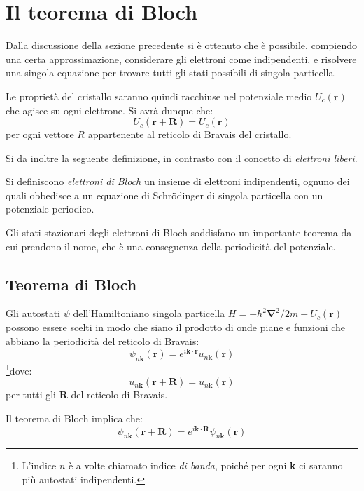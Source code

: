 \section{Il teorema di Bloch}

Dalla discussione della sezione precedente si è ottenuto che è possibile, compiendo una certa approssimazione, considerare gli elettroni come indipendenti, e risolvere una singola equazione per trovare tutti gli stati possibili di singola particella. 

Le proprietà del cristallo saranno quindi racchiuse nel potenziale medio $ U_c(\textbf{r}) $ che agisce su ogni elettrone. Si avrà dunque che:
\[ U_c(\textbf{r} + \textbf{R}) = U_c(\textbf{r}) \]
per ogni vettore $ R $ appartenente al reticolo di Bravais del cristallo.

Si da inoltre la seguente definizione, in contrasto con il concetto di \textit{elettroni liberi}.
\begin{defn}
	Si definiscono \textit{elettroni di Bloch} un insieme di elettroni indipendenti, ognuno dei quali obbedisce a un equazione di Schrödinger di singola particella con un potenziale periodico.
\end{defn}
Gli stati stazionari degli elettroni di Bloch soddisfano un importante teorema da cui prendono il nome, che è una conseguenza della periodicità del potenziale.

\subsection{Teorema di Bloch}

\begin{thm}[di Bloch]
	Gli autostati $ \psi $ dell'Hamiltoniano singola particella $ H = - \hbar^2\bm{\nabla}^2/2m + U_c(\textbf{r}) $ possono essere scelti in modo che siano il prodotto di onde piane e funzioni che abbiano la periodicità del reticolo di Bravais:
	\[ \psi_{n\textbf{k}}(\textbf{r}) = e^{i\textbf{k}\cdot\textbf{r}} u_{n\textbf{k}}(\textbf{r}) \]
	\footnote{L'indice $ n $ è a volte chiamato indice \textit{di banda}, poiché per ogni \textbf{k} ci saranno più autostati indipendenti.}dove:
	\[ u_{n\textbf{k}}(\textbf{r} + \textbf{R}) = u_{n\textbf{k}}(\textbf{r}) \]
	per tutti gli $ \textbf{R} $ del reticolo di Bravais.
\end{thm}

Il teorema di Bloch implica che:
\[  \psi_{n\textbf{k}}(\textbf{r} + \textbf{R}) = e^{i\textbf{k}\cdot\textbf{R}} \psi_{n\textbf{k}}(\textbf{r})\]

